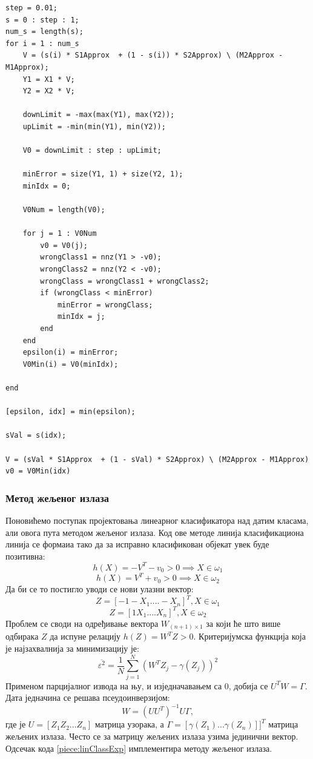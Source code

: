 \begin{lstlisting}[caption={Пројектовање линеарног класификатора},label={piece:linClassProj}]
step = 0.01;
s = 0 : step : 1;
num_s = length(s);
for i = 1 : num_s
    V = (s(i) * S1Approx  + (1 - s(i)) * S2Approx) \ (M2Approx - M1Approx);
    Y1 = X1 * V;
    Y2 = X2 * V;
    
    downLimit = -max(max(Y1), max(Y2));
    upLimit = -min(min(Y1), min(Y2));
    
    V0 = downLimit : step : upLimit;
    
    minError = size(Y1, 1) + size(Y2, 1);
    minIdx = 0;
    
    V0Num = length(V0);
    
    for j = 1 : V0Num
        v0 = V0(j);
        wrongClass1 = nnz(Y1 > -v0);
        wrongClass2 = nnz(Y2 < -v0);
        wrongClass = wrongClass1 + wrongClass2;
        if (wrongClass < minError)
            minError = wrongClass;
            minIdx = j;
        end
    end
    epsilon(i) = minError;
    V0Min(i) = V0(minIdx);
    
end

[epsilon, idx] = min(epsilon);

sVal = s(idx);

V = (sVal * S1Approx  + (1 - sVal) * S2Approx) \ (M2Approx - M1Approx)
v0 = V0Min(idx)

\end{lstlisting}

\subsubsection{Метод жељеног излаза}
Поновићемо поступак пројектовања линеарног класификатора над датим класама, али овога пута методом жељеног излаза. Код ове методе линија класификациона линија се формаиа тако да за исправно класификован објекат увек буде позитивна:
$$h(X) = -V^T - v_0 > 0 \implies X \in \omega_1$$
$$h(X) = V^T + v_0 > 0 \implies X \in \omega_2$$
Да би се то постигло уводи се нови улазни вектор:
$$Z=[-1 -X_1 .... -X_n]^T,X\in \omega_1$$
$$Z=[1 X_1 .... X_n]^T,X\in \omega_2$$
Проблем се своди на одређивање вектора $W_{(n+1)\times1}$ за који ће што више одбирака $Z$ да испуне релацију $h(Z) = W^TZ > 0$. Критеријумска функција која је најзахвалнија за минимизацију је:
$$\overline{\varepsilon^2} = \frac{1}{N} \sum_{j=1}^N (W^TZ_j - \gamma(Z_j))^2$$
Применом парцијалног извода на њу, и изједначавањем са 0, добија се $U^TW = \Gamma$.
Дата једначина се решава псеудоинверзијом:
$$W = (UU^T)^{-1}U \Gamma,$$
где је $U=[Z_1 Z_2 ... Z_n]$ матрица узорака, а $\Gamma=[\gamma(Z_1) ... \gamma(Z_n)]]^T$ матрица жељених излаза.
Често се за матрицу жељених излаза узима јединични вектор. Одсечак кода \ref{piece:linClassExp} имплементира методу жељеног излаза. 

